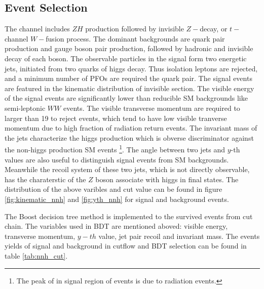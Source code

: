 \subsection{\nnh Event Selection}
The \nnh channel includes $ZH$ production followed by invisible $Z-$decay, or $t-$channel $W-$fusion process. 
The dominant backgrounds are quark pair production and gauge boson pair production, followed by hadronic and invisible decay of each boson. 
The observable particles in the signal form two energetic jets, initiated from two quarks of higgs decay. 
Thus isolation leptons are rejected, and a minimum number of PFOs are required the quark pair. 
The signal events are featured in the kinematic distribution of invisible section.  
The visible energy of the signal events are significantly lower than reducible SM backgrounds like semi-leptonic $WW$ events. 
The visible transverse momentum are required to larger than 19 \GeV to reject \qpair events, which tend to have low visible tranverse momentum due to 
high fraction of radiation return events.
The invariant mass of the jets characterize the higgs production which is obverse discriminator against the non-higgs production SM events
\footnote{The peak of in signal region of \qpair events is due to radiation events.}.
The angle between two jets and $y$-th values are also useful to distinguish signal events from SM backgrounds.  
Meanwhile the recoil system of these two jets, which is not directly observable, has the charaterstic of the $Z$ boson associate with higgs in final states. The distribution of the above varibles and cut value can be found in figure \ref{fig:kinematic_nnh} and \ref{fig:yth_nnh} for signal and background events. \par

The Boost decision tree \cite{BDT} method is implemented to the survived events from cut chain. The variables used 
in BDT are mentioned aboved: visible energy,  transverse momentum, $y-th$ value, jet pair recoil and invariant mass. 
The events yields of signal and background in cutflow and BDT selection can be found in table \ref{tab:nnh_cut}. \par


